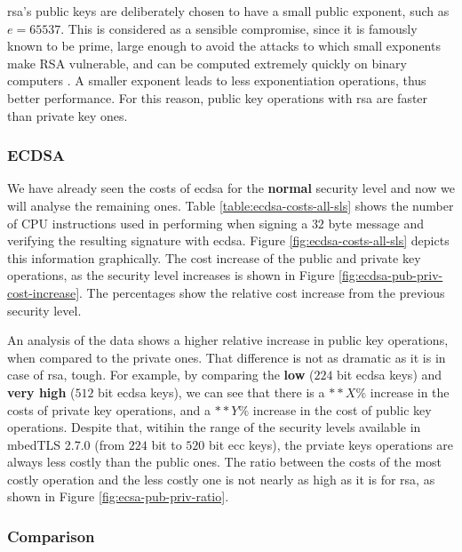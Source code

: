 \documentclass{llncs}
\begin{document}
\gls{rsa}'s public keys are deliberately chosen to have a small public exponent, such as $e=65537$. This is considered as a
sensible compromise, since it is famously known to be prime, large enough to avoid the attacks to which 
small exponents make RSA vulnerable, and can be computed extremely quickly on binary computers \cite{boneh2002fast}\cite{muir2006seifert}.
A smaller exponent leads to less exponentiation operations, thus better performance. For this reason, public
key operations with \gls{rsa} are faster than private key ones.

\subsubsection{ECDSA}

We have already seen the costs of \gls{ecdsa} for the \textbf{normal} security level and now we will analyse the
remaining ones. Table \ref{table:ecdsa-costs-all-sls} shows the number of CPU instructions used in performing
when signing a $32$ byte message and verifying the resulting signature with \gls{ecdsa}. Figure \ref{fig:ecdsa-costs-all-sls}
depicts this information graphically. The cost increase of the public and private key operations, as the security level 
increases is shown in Figure \ref{fig:ecdsa-pub-priv-cost-increase}. The percentages show the relative cost increase 
from the previous security level.

An analysis of the data shows a higher relative increase in public key operations, when compared to the private ones.
That difference is not as dramatic as it is in case of \gls{rsa}, tough. For example, by comparing the 
\textbf{low} ($224$ bit \gls{ecdsa} keys) and \textbf{very high} ($512$ bit \gls{ecdsa} keys), 
we can see that there is a $**X\%$ increase in the costs of private key operations, and a  $**Y\%$  increase in the 
cost of public key operations. Despite that, witihin the range of the security levels available in mbedTLS 2.7.0 (from $224$ bit to $520$ bit \gls{ecc} keys), 
the prviate keys operations are always less costly than the public ones. The ratio between the costs of the most costly operation and the less costly one
is not nearly as high as it is for \gls{rsa}, as shown in Figure \ref{fig:ecsa-pub-priv-ratio}.



\subsubsection{Comparison}
\end{document}
